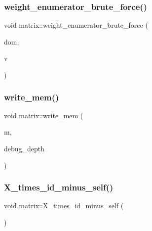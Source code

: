 \mbox{\label{classmatrix_aae7c9c7c3540c5818d2df52ab67f8a52}} 
\subsubsection{\texorpdfstring{weight\+\_\+enumerator\+\_\+brute\+\_\+force()}{weight\_enumerator\_brute\_force()}}
{\footnotesize\ttfamily void matrix\+::weight\+\_\+enumerator\+\_\+brute\+\_\+force (\begin{DoxyParamCaption}\item[{\mbox{\hyperlink{classdomain}{domain}} $\ast$}]{dom,  }\item[{\mbox{\hyperlink{class_vector}{Vector}} \&}]{v }\end{DoxyParamCaption})}

\mbox{\label{classmatrix_a773aa4ab691548beba8e6204d9f4ef21}} 
\subsubsection{\texorpdfstring{write\+\_\+mem()}{write\_mem()}}
{\footnotesize\ttfamily void matrix\+::write\+\_\+mem (\begin{DoxyParamCaption}\item[{\mbox{\hyperlink{classmemory}{memory}} \&}]{m,  }\item[{\mbox{\hyperlink{galois_8h_a09fddde158a3a20bd2dcadb609de11dc}{I\+NT}}}]{debug\+\_\+depth }\end{DoxyParamCaption})}

\mbox{\label{classmatrix_a42aa27f4ae06ceff8cb297894bb5aad4}} 
\subsubsection{\texorpdfstring{X\+\_\+times\+\_\+id\+\_\+minus\+\_\+self()}{X\_times\_id\_minus\_self()}}
{\footnotesize\ttfamily void matrix\+::\+X\+\_\+times\+\_\+id\+\_\+minus\+\_\+self (\begin{DoxyParamCaption}{ }\end{DoxyParamCaption})}

